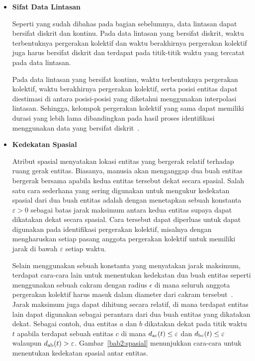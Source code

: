\begin{itemize}
    \item \textbf{Sifat Data Lintasan}
    
    Seperti yang sudah dibahas pada bagian sebelumnya, data lintasan dapat bersifat diskrit dan kontinu. Pada data lintasan yang bersifat diskrit, waktu terbentuknya pergerakan kolektif dan waktu berakhirnya pergerakan kolektif juga harus bersifat diskrit dan terdapat pada titik-titik waktu yang tercatat pada data lintasan.
    
    Pada data lintasan yang bersifat kontinu, waktu terbentuknya pergerakan kolektif, waktu berakhirnya pergerakan kolektif, serta posisi entitas dapat diestimasi di antara posisi-posisi yang diketahui menggunakan interpolasi lintasan. Sehingga, kelompok pergerakan kolektif yang sama dapat memiliki durasi yang lebih lama dibandingkan pada hasil proses identifikasi menggunakan data yang bersifat diskrit~\cite{wiratma:trajectory}.

    \item \textbf{Kedekatan Spasial}
    
    Atribut spasial menyatakan lokasi entitas yang bergerak relatif terhadap ruang gerak entitas. Biasanya, manusia akan menganggap dua buah entitas bergerak bersama apabila kedua entitas tersebut dekat secara spasial. Salah satu cara sederhana yang sering digunakan untuk mengukur kedekatan spasial dari dua buah entitas adalah dengan menetapkan sebuah konstanta $\varepsilon > 0$ \iffalse \lionov{pake varepsilon ($\varepsilon$)} \fi sebagai batas jarak maksimum antara kedua entitas supaya dapat dikatakan dekat secara spasial. Cara tersebut dapat diperluas untuk dapat digunakan pada identifikasi pergerakan kolektif, misalnya dengan mengharuskan setiap pasang anggota pergerakan kolektif untuk memiliki jarak di bawah $\varepsilon$ setiap waktu.
    
    Selain menggunakan sebuah konstanta yang menyatakan jarak maksimum, terdapat cara-cara lain untuk menentukan kedekatan dua buah entitas seperti menggunakan sebuah cakram dengan radius $\epsilon$ di mana seluruh anggota pergerakan kolektif harus masuk dalam diameter dari cakram tersebut~\cite{gudmundsson:flock}. Jarak maksimum juga dapat dihitung secara relatif, di mana terdapat entitas lain dapat digunakan sebagai perantara dari dua buah entitas yang dikatakan dekat. Sebagai contoh, dua entitas $a$ dan $b$ dikatakan dekat pada titik waktu $t$ apabila terdapat sebuah entitas $c$ di mana $d\textsubscript{ac}(t) \leq \varepsilon$ dan $d\textsubscript{bc}(t) \leq \varepsilon$ walaupun $d\textsubscript{ab}(t) > \varepsilon$. \iffalse \lionov{harus didefinisikan dulu sebelumnya kalo $d_{ac}(t)$ itu menyatakan jarak $a$ dan $c$ pada waktu $t$} \cristopher{udah di bagian~\ref{sec:kemiripan} ko} \fi Gambar~\ref{bab2:spasial} menunjukkan cara-cara untuk menentukan kedekatan spasial antar entitas.
    

\end{itemize}
